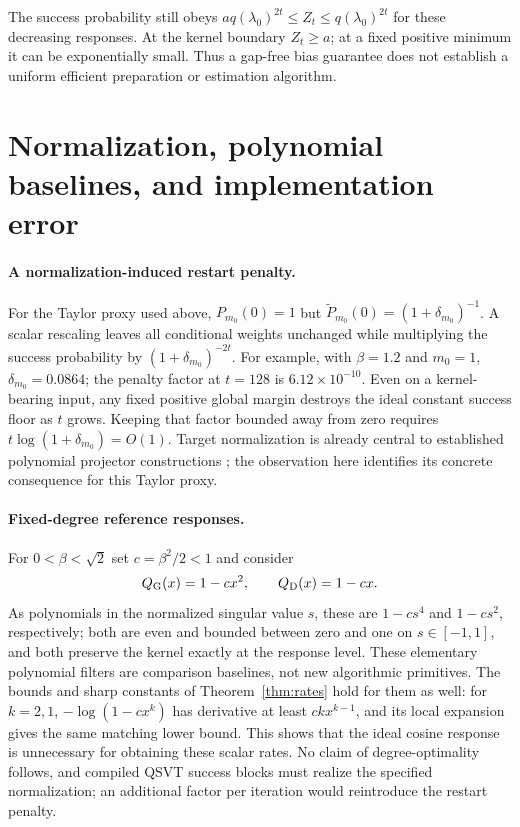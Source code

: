 The success probability still obeys
$a q(\lambda_0)^{2t}\leq Z_t\leq q(\lambda_0)^{2t}$ for these decreasing
responses. At the kernel boundary $Z_t\geq a$; at a fixed positive minimum it
can be exponentially small. Thus a gap-free bias guarantee does not establish
a uniform efficient preparation or estimation algorithm.

\section{Normalization, polynomial baselines, and implementation error}
\label{sec:normalization}
\paragraph{A normalization-induced restart penalty.}
For the Taylor proxy used above, $P_{m_0}(0)=1$ but
$\widetilde P_{m_0}(0)=(1+\delta_{m_0})^{-1}$. A scalar rescaling leaves all
conditional weights unchanged while multiplying the success probability by
$(1+\delta_{m_0})^{-2t}$. For example, with $\beta=1.2$ and $m_0=1$,
$\delta_{m_0}=0.0864$; the penalty factor at $t=128$ is
$6.12\times10^{-10}$. Even on a kernel-bearing input, any fixed positive
global margin destroys the ideal constant success floor as $t$ grows.
Keeping that factor bounded away from zero requires
$t\log(1+\delta_{m_0})=O(1)$. Target normalization is already central to
established polynomial projector constructions \cite{LinTongFilter}; the
observation here identifies its concrete consequence for this Taylor proxy.

\paragraph{Fixed-degree reference responses.}
For $0<\beta<\sqrt{2}$ set $c=\beta^2/2<1$ and consider
\[
 Q_{\rm G}(x)=1-cx^2,\qquad Q_{\rm D}(x)=1-cx.
\]
As polynomials in the normalized singular value $s$, these are $1-cs^4$
and $1-cs^2$, respectively; both are even and bounded between zero and one
on $s\in[-1,1]$, and both preserve the kernel exactly at the response level.
These elementary polynomial filters are comparison baselines, not new
algorithmic primitives. The bounds and sharp constants of
Theorem~\ref{thm:rates} hold for them as well: for $k=2,1$,
$-\log(1-cx^k)$ has derivative at least $ckx^{k-1}$, and its local expansion
gives the same matching lower bound. This shows that the ideal cosine
response is unnecessary for obtaining these scalar rates. No claim of
degree-optimality follows, and compiled QSVT success blocks must realize the
specified normalization; an additional factor per iteration would reintroduce
the restart penalty.

